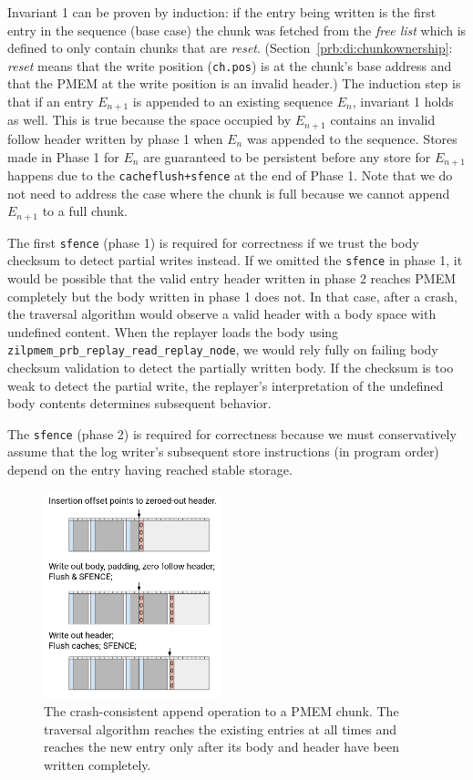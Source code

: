 \documentclass[12pt,a4paper,twoside]{book}
\begin{document}
Invariant 1 can be proven by induction:
if the entry being written is the first entry in the sequence (base case) the chunk was fetched from the \textit{free list} which is defined to only contain chunks that are \textit{reset}.
(Section~\ref{prb:di:chunkownership}: \textit{reset} means that the write position (\lstinline{ch.pos}) is at the chunk's base address and that the PMEM at the write position is an invalid header.)
The induction step is that if an entry $E_{n+1}$ is appended to an existing sequence $E_n$, invariant 1 holds as well.
This is true because the space occupied by $E_{n+1}$ contains an invalid follow header written by phase 1 when $E_n$ was appended to the sequence.
Stores made in Phase 1 for $E_n$ are guaranteed to be persistent before any store for $E_{n+1}$ happens due to the \lstinline{cacheflush+sfence} at the end of Phase 1.
Note that we do not need to address the case where the chunk is full because we cannot append $E_{n+1}$ to a full chunk.

The first \lstinline{sfence} (phase 1) is required for correctness if we trust the body checksum to detect partial writes instead.
If we omitted the \lstinline{sfence} in phase 1, it would be possible that the valid entry header written in phase 2 reaches PMEM completely but the body written in phase 1 does not.
In that case, after a crash, the traversal algorithm would observe a valid header with a body space with undefined content.
When the replayer loads the body using \lstinline{zilpmem_prb_replay_read_replay_node}, we would rely fully on failing body checksum validation to detect the partially written body.
If the checksum is too weak to detect the partial write, the replayer's interpretation of the undefined body contents determines subsequent behavior.

The \lstinline{sfence} (phase 2) is required for correctness  because we must conservatively assume that the log writer's subsequent store instructions (in program order) depend on the entry having reached stable storage.

\begin{figure}[H]
    \centering
    \includegraphics[height=6cm]{fig/prb_writepath_crashconsistent_append}
    \caption{
        The crash-consistent append operation to a PMEM chunk.
        The traversal algorithm reaches the existing entries at all times and reaches the new entry only after its body and header have been written completely.
    }
    \label{fig:prb_writepath_crashconsistent_append}
\end{figure}
\end{document}
